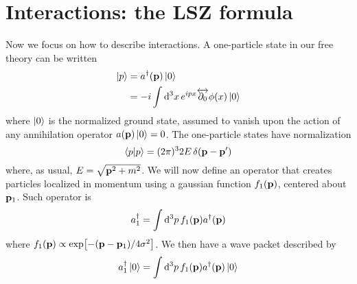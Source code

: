 
\section{Interactions: the LSZ formula}
Now we focus on how to describe interactions. A one-particle state in our free theory can be written
\begin{equation}
\begin{aligned}
    \ket{p}&=a^{\dagger}(\vb{p})\ket{0}\\
    &=-i\int\dd^3x\,e^{ipx}\overleftrightarrow{\partial_0}\phi(x)\ket{0}
\end{aligned}
\end{equation}
where $\ket{0}$ is the normalized ground state, assumed to vanish upon the action of any annihilation operator $a(\vb{p})\ket{0}=0$. The one-particle states have normalization 
\begin{equation}
    \braket{p}=(2\pi)^32E\,\delta(\vb{p}-\vb{p}^\prime)
\end{equation}
where, as usual, $E=\sqrt{\vb{p}^2+m^2}$. We will now define an operator that creates particles localized in momentum using a gaussian function $f_1(\vb{p})$, centered about $\vb{p}_1$. Such operator is
\begin{equation}
    a_1^\dagger=\int\dd^3p\,f_1(\vb{p})a^\dagger(\vb{p})
\end{equation}
where $f_1(\vb{p})\propto\exp[-(\vb{p}-\vb{p}_1)/4\sigma^2]$. We then have a wave packet described by
\begin{equation}
    a_1^{\dagger}\ket{0}=\int\dd^3p\,f_1(\vb{p})a^\dagger(\vb{p})\ket{0}
\end{equation}

